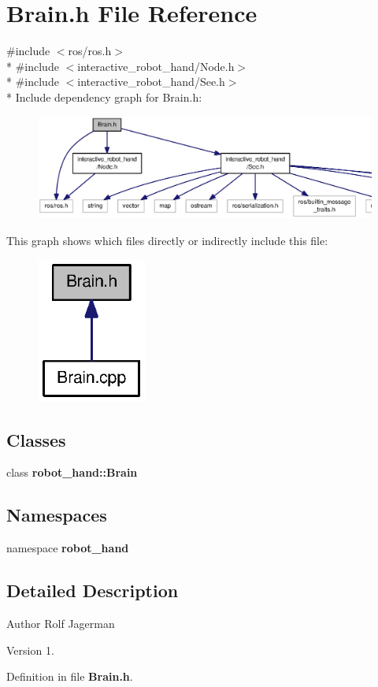 \section{Brain.\-h File Reference}
\label{Brain_8h}
{\ttfamily \#include $<$ros/ros.\-h$>$}\\*
{\ttfamily \#include $<$interactive\-\_\-robot\-\_\-hand/\-Node.\-h$>$}\\*
{\ttfamily \#include $<$interactive\-\_\-robot\-\_\-hand/\-See.\-h$>$}\\*
Include dependency graph for Brain.\-h\-:
\nopagebreak
\begin{figure}[H]
\begin{center}
\leavevmode
\includegraphics[width=350pt]{Brain_8h__incl}
\end{center}
\end{figure}
This graph shows which files directly or indirectly include this file\-:
\nopagebreak
\begin{figure}[H]
\begin{center}
\leavevmode
\includegraphics[width=102pt]{Brain_8h__dep__incl}
\end{center}
\end{figure}
\subsection*{Classes}
\begin{DoxyCompactItemize}
\item 
class {\bf robot\-\_\-hand\-::\-Brain}
\end{DoxyCompactItemize}
\subsection*{Namespaces}
\begin{DoxyCompactItemize}
\item 
namespace {\bf robot\-\_\-hand}
\end{DoxyCompactItemize}


\subsection{Detailed Description}
\begin{DoxyAuthor}{Author}
Rolf Jagerman 
\end{DoxyAuthor}
\begin{DoxyVersion}{Version}
1. 
\end{DoxyVersion}


Definition in file {\bf Brain.\-h}.

